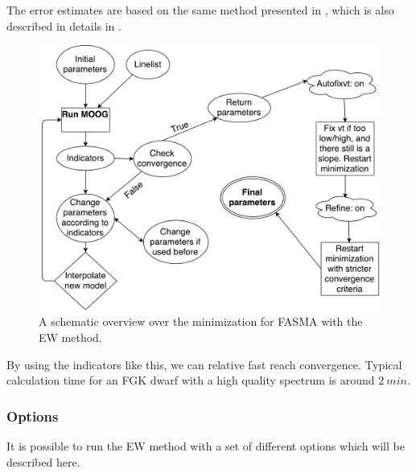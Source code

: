 \documentclass{aa}
\begin{document}
The error estimates are based on the same method presented in
\citet{Gonzalez2000}, which is also described in details in
\citet{Santos2003,Andreasen2016}.

\begin{figure}[tpb]
    \centering
    \includegraphics[width=1.0\linewidth,natwidth=700,natheight=650]{figures/FASMA_minimization.pdf}
    \caption{A schematic overview over the minimization for FASMA with the
    EW method.}
    \label{fig:FASMA_minimization}
\end{figure}

By using the indicators like this, we can relative fast reach convergence.
Typical calculation time for an FGK dwarf with a high quality spectrum is around
$\SI{2}{min}$.

\subsubsection{Options}
\label{subs:EWoptions}
It is possible to run the EW method with a set of different options which
will be described here.
\end{document}
